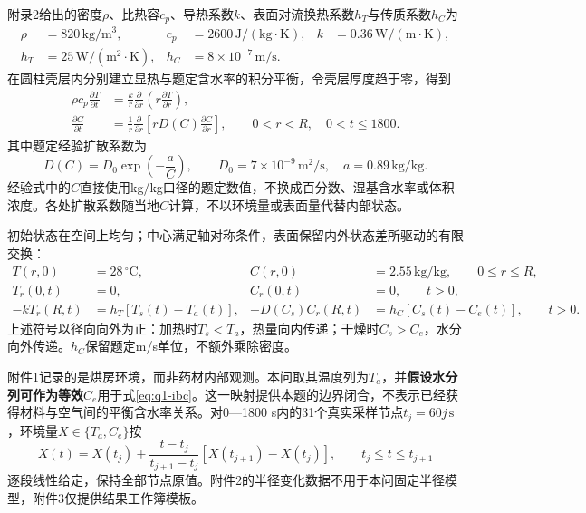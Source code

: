 附录2给出的密度$\rho$、比热容$c_p$、导热系数$k$、表面对流换热系数$h_T$与传质系数$h_C$为
\begin{equation}
\begin{aligned}
\rho&=820\,\mathrm{kg/m^3},&
c_p&=2600\,\mathrm{J/(kg\cdot K)},&
k&=0.36\,\mathrm{W/(m\cdot K)},\\
h_T&=25\,\mathrm{W/(m^2\cdot K)},&
h_C&=8\times10^{-7}\,\mathrm{m/s}.&&
\end{aligned}
\label{eq:q1-parameters}
\end{equation}
在圆柱壳层内分别建立显热与题定含水率的积分平衡，令壳层厚度趋于零，得到
\begin{equation}
\begin{aligned}
\rho c_p\frac{\partial T}{\partial t}
&=\frac{k}{r}\frac{\partial}{\partial r}
 \left(r\frac{\partial T}{\partial r}\right),\\
\frac{\partial C}{\partial t}
&=\frac{1}{r}\frac{\partial}{\partial r}
 \left[rD(C)\frac{\partial C}{\partial r}\right],
\qquad 0<r<R,\quad 0<t\le1800.
\end{aligned}
\label{eq:q1-pde}
\end{equation}
其中题定经验扩散系数为
\begin{equation}
D(C)=D_0\exp\!\left(-\frac{a}{C}\right),
\qquad D_0=7\times10^{-9}\,\mathrm{m^2/s},\quad a=0.89\,\mathrm{kg/kg}.
\label{eq:q1-diffusion}
\end{equation}
经验式中的$C$直接使用kg/kg口径的题定数值，不换成百分数、湿基含水率或体积浓度。各处扩散系数随当地$C$计算，不以环境量或表面量代替内部状态。

初始状态在空间上均匀；中心满足轴对称条件，表面保留内外状态差所驱动的有限交换：
\begin{equation}
\begin{aligned}
T(r,0)&=28\,{}^{\circ}\mathrm C,&
C(r,0)&=2.55\,\mathrm{kg/kg},\qquad 0\le r\le R,\\
T_r(0,t)&=0,& C_r(0,t)&=0,\qquad t>0,\\
-kT_r(R,t)&=h_T[T_s(t)-T_a(t)],&
-D(C_s)C_r(R,t)&=h_C[C_s(t)-C_e(t)],\qquad t>0.
\end{aligned}
\label{eq:q1-ibc}
\end{equation}
上述符号以径向向外为正：加热时$T_s<T_a$，热量向内传递；干燥时$C_s>C_e$，水分向外传递。$h_C$保留题定m/s单位，不额外乘除密度。

附件1记录的是烘房环境，而非药材内部观测。本问取其温度列为$T_a$，并\textbf{假设水分列可作为等效$C_e$}用于式\eqref{eq:q1-ibc}。这一映射提供本题的边界闭合，不表示已经获得材料与空气间的平衡含水率关系。对0—1800 s内的31个真实采样节点$t_j=60j\,\mathrm{s}$，环境量$X\in\{T_a,C_e\}$按
\begin{equation}
X(t)=X(t_j)+\frac{t-t_j}{t_{j+1}-t_j}
       [X(t_{j+1})-X(t_j)],\qquad t_j\le t\le t_{j+1}
\label{eq:q1-environment}
\end{equation}
逐段线性给定，保持全部节点原值。附件2的半径变化数据不用于本问固定半径模型，附件3仅提供结果工作簿模板。

